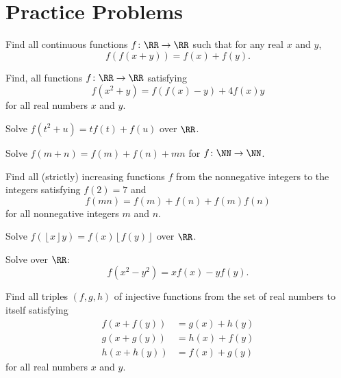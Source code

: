 \documentclass[11pt]{scrartcl}
\begin{document}
\eject

\section{Practice Problems}
\begin{problem}
  Find all continuous functions $f \colon \RR \to \RR$
  such that  for any real $x$ and $y$,
  \[ f(f(x+y)) = f(x) + f(y). \]
\end{problem}

\begin{problem}
  Find, all functions $f\colon \RR \to \RR$ satisfying
  \[ f(x^2+y) = f(f(x)-y) + 4f(x)y \]
  for all real numbers $x$ and $y$.
\end{problem}

\begin{problem}
  Solve $f(t^2+u) = tf(t) + f(u)$ over $\RR$.
  \label{pr:finish_up}
\end{problem}

\begin{problem}
  Solve $f(m+n)=f(m)+f(n)+mn$ for $f \colon \NN \to \NN$.
\end{problem}

\begin{problem}
  Find all (strictly) increasing functions $f$ from the nonnegative integers
  to the integers satisfying $f(2)=7$ and \[ f(mn) = f(m) + f(n) + f(m)f(n) \]
  for all nonnegative integers $m$ and $n$.
\end{problem}

\begin{problem}
  [IMO 2010/1]
  Solve $f(\left\lfloor x\right\rfloor y)=f(x)\left\lfloor f(y)\right\rfloor$ over $\RR$.
\end{problem}

\begin{problem}
  [USAMO 2002/4]
  Solve over $\RR$: \[ f(x^2-y^2) = xf(x) - yf(y). \]
\end{problem}

\begin{problem}
  [ELMO 2014]
  Find all triples $(f,g,h)$ of injective functions from the set of real numbers to itself satisfying
  \begin{align*}
    f(x+f(y)) &= g(x) + h(y) \\
    g(x+g(y)) &= h(x) + f(y) \\
    h(x+h(y)) &= f(x) + g(y)
  \end{align*}
  for all real numbers $x$ and $y$.
\end{problem}
\end{document}
